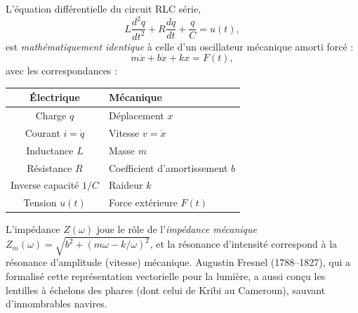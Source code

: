 \documentclass[11pt]{article}
\begin{document}
\begin{savaistu}
L'équation différentielle du circuit RLC série,
\[
L\frac{d^2q}{dt^2} + R\frac{dq}{dt} + \frac{q}{C} = u(t),
\]
est \emph{mathématiquement identique} à celle d'un oscillateur mécanique amorti forcé :
\[
m\ddot{x} + b\dot{x} + kx = F(t),
\]
avec les correspondances :
\begin{center}
\begin{tabularx}{\linewidth}{c|X}
\textbf{Électrique} & \textbf{Mécanique} \\ \hline
Charge $q$ & Déplacement $x$ \\
Courant $i=\dot{q}$ & Vitesse $v=\dot{x}$ \\
Inductance $L$ & Masse $m$ \\
Résistance $R$ & Coefficient d'amortissement $b$ \\
Inverse capacité $1/C$ & Raideur $k$ \\
Tension $u(t)$ & Force extérieure $F(t)$
\end{tabularx}
\end{center}
L'impédance $Z(\omega)$ joue le rôle de l'\emph{impédance mécanique} $Z_m(\omega) = \sqrt{b^2 + (m\omega - k/\omega)^2}$, et la résonance d'intensité correspond à la résonance d'amplitude (vitesse) mécanique. Augustin Fresnel (1788–1827), qui a formalisé cette représentation vectorielle pour la lumière, a aussi conçu les lentilles à échelons des phares (dont celui de Kribi au Cameroun), sauvant d'innombrables navires.
\end{savaistu}
\end{document}
